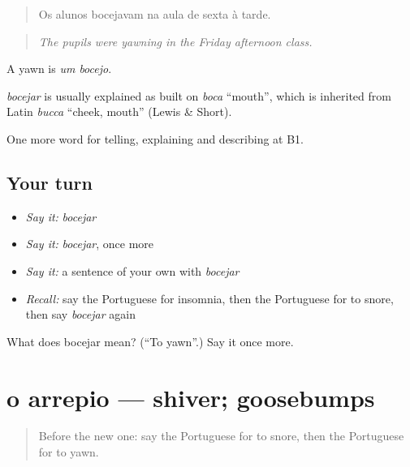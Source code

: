 \begin{quote}
Os alunos bocejavam na aula de sexta à tarde.
\end{quote}

\begin{quote}
\emph{The pupils were yawning in the Friday afternoon class.}
\end{quote}

A yawn is \emph{um bocejo}.

\begin{cousinweb}
\emph{bocejar} is usually explained as built on \emph{boca} \textquotedblleft{}mouth\textquotedblright{}, which is inherited from Latin \emph{bucca} \textquotedblleft{}cheek, mouth\textquotedblright{} (Lewis \& Short).
\end{cousinweb}

\begin{grammarlens}[title={What you've built}]
One more word for telling, explaining and describing at B1.
\end{grammarlens}

\subsection*{Your turn}
\begin{itemize}
\raggedright
  \item \emph{Say it:} \emph{bocejar}
  \item \emph{Say it:} \emph{bocejar}, once more
  \item \emph{Say it:} a sentence of your own with \emph{bocejar}
  \item \emph{Recall:} say the Portuguese for insomnia, then the Portuguese for to snore, then say \emph{bocejar} again
\end{itemize}

\begin{tcolorbox}[breakable,colback=teal!4,colframe=teal!35!black,title={Before you move on}]
What does bocejar mean? (\textquotedblleft{}To yawn\textquotedblright{}.) Say it once more.
\end{tcolorbox}
\section[o arrepio]{o arrepio — shiver; goosebumps}

\label{lesson:PT-C489-arrepio}



\begin{quote}
Before the new one: say the Portuguese for to snore, then the Portuguese for to yawn.
\end{quote}

